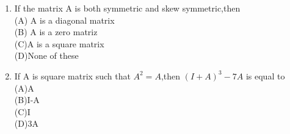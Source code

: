 \begin{enumerate}[label=\arabic*.,ref=\thesubsection.\theenumi]
\\
\solution

  \item If the matrix A is both symmetric and skew symmetric,then\\
  (A) A is a diagonal matrix \\
  (B) A is a zero matriz\\
  (C)A is a square matrix \\
  (D)None of these\\
  \item If A is square matrix such that $A^{2}=A$,then $(I+A)^{3}-7A$ is equal to\\
  (A)A \\(B)I-A\\ (C)I\\ (D)3A
\\
\solution

  \end{enumerate}

%        
